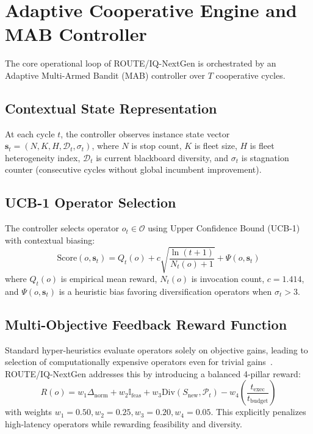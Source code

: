 \section{Adaptive Cooperative Engine and MAB Controller}
\label{sec:cooperative_engine}
The core operational loop of ROUTE/IQ-NextGen is orchestrated by an Adaptive Multi-Armed Bandit (MAB) controller over $T$ cooperative cycles.

\subsection{Contextual State Representation}
At each cycle $t$, the controller observes instance state vector $\mathbf{s}_t = (N, K, H, \mathcal{D}_t, \sigma_t)$, where $N$ is stop count, $K$ is fleet size, $H$ is fleet heterogeneity index, $\mathcal{D}_t$ is current blackboard diversity, and $\sigma_t$ is stagnation counter (consecutive cycles without global incumbent improvement).

\subsection{UCB-1 Operator Selection}
The controller selects operator $o_t \in \mathcal{O}$ using Upper Confidence Bound (UCB-1)~\cite{auer2002finite} with contextual biasing:
\begin{equation}
\text{Score}(o, \mathbf{s}_t) = Q_t(o) + c \sqrt{\frac{\ln(t + 1)}{N_t(o) + 1}} + \Psi(o, \mathbf{s}_t)
\end{equation}
where $Q_t(o)$ is empirical mean reward, $N_t(o)$ is invocation count, $c = 1.414$, and $\Psi(o, \mathbf{s}_t)$ is a heuristic bias favoring diversification operators when $\sigma_t > 3$.

\subsection{Multi-Objective Feedback Reward Function}
Standard hyper-heuristics evaluate operators solely on objective gains, leading to selection of computationally expensive operators even for trivial gains~\cite{burke2013hyper}. ROUTE/IQ-NextGen addresses this by introducing a balanced 4-pillar reward:
\begin{equation}
R(o) = w_1 \Delta_{\text{norm}} + w_2 \mathbb{I}_{\text{feas}} + w_3 \text{Div}(S_{\text{new}}, \mathcal{P}_t) - w_4 \left(\frac{t_{\text{exec}}}{t_{\text{budget}}}\right)
\end{equation}
with weights $w_1 = 0.50, w_2 = 0.25, w_3 = 0.20, w_4 = 0.05$. This explicitly penalizes high-latency operators while rewarding feasibility and diversity.
